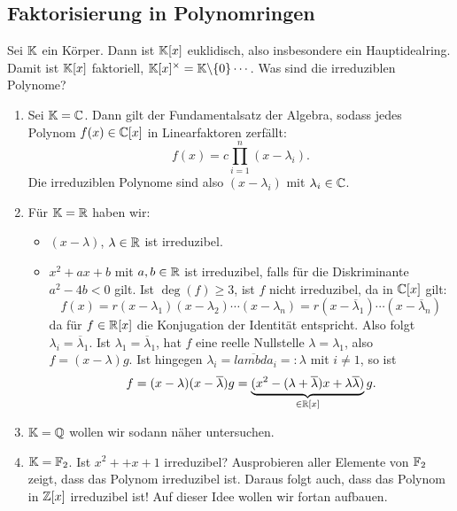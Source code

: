 \subsection{Faktorisierung in Polynomringen}
\label{sec:galois}

\begin{beispiele}
Sei $\mathbb{K}$ ein Körper. Dann ist $\mathbb{K}[x]$ euklidisch, also insbesondere ein Hauptidealring. Damit ist $\mathbb{K}[x]$ faktoriell, $\mathbb{K}[x]^\times = \mathbb{K} \backslash \{0\} \cdots$. Was sind die irreduziblen Polynome?
\begin{enumerate}
\item Sei $\mathbb{K} = \mathbb{C}$. Dann gilt der Fundamentalsatz der Algebra, sodass jedes Polynom $f(x) \in \mathbb{C}[x]$ in Linearfaktoren zerfällt:
\begin{equation}
f(x) = c \prod_{i=1}^n (x-\lambda_i).
\end{equation}
Die irreduziblen Polynome sind also $(x-\lambda_i)$ mit $\lambda_i \in \mathbb{C}$.
\item Für $\mathbb{K} = \mathbb{R}$ haben wir:
\begin{itemize}
\item $(x-\lambda)$, $\lambda \in \mathbb{R}$ ist irreduzibel.
\item $x^2+ax+b$ mit $a,b \in \mathbb{R}$ ist irreduzibel, falls für die Diskriminante $a^2-4b<0$ gilt. Ist $\deg(f)\geq 3$, ist $f$ nicht irreduzibel, da in $\mathbb{C}[x]$ gilt:
\begin{equation}
f(x) = r(x-\lambda_1)(x-\lambda_2) \cdots (x-\lambda_n)= r(x-\overline{\lambda}_1) \cdots (x -\overline{\lambda}_n)
\end{equation}
da für $f \in \mathbb{R}[x]$ die Konjugation der Identität entspricht. Also folgt $\lambda_i = \overline{\lambda}_1$. Ist $\lambda_1 = \overline{\lambda}_1$, hat $f$ eine reelle Nullstelle $\lambda = \lambda_1$, also $f=(x-\lambda)g$. Ist hingegen $\lambda_i = \overline{lambda}_i =: \lambda$ mit $i \neq 1$, so ist 
\begin{equation}
f = (x-\lambda)(x-\overline{\lambda})g = \underbrace{(x^2 - (\lambda + \overline{\lambda})x + \lambda \overline{\lambda})}_{\in \mathbb{R}[x]}g.
\end{equation} 
\end{itemize}
\item $\mathbb{K} = \mathbb{Q}$ wollen wir sodann näher untersuchen.
\item $\mathbb{K} = \mathbb{F}_2$. Ist $x^2++x+1$ irreduzibel? Ausprobieren aller Elemente von $\mathbb{F}_2$ zeigt, dass das Polynom irreduzibel ist. Daraus folgt auch, dass das Polynom in $\mathbb{Z}[x]$ irreduzibel ist! Auf dieser Idee wollen wir fortan aufbauen.
\end{enumerate}
\end{beispiele}
